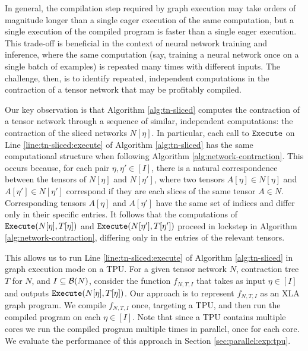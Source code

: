 In general, the compilation step required by graph execution may take orders of magnitude longer than a single eager execution of the same computation, but a single execution of the compiled program is faster than a single eager execution. 
This trade-off is beneficial in the context of neural network training and inference, where the same computation (say, training a neural network once on a single batch of examples) is repeated many times with different inputs.
The challenge, then, is to identify repeated, independent computations in the contraction of a tensor network that may be profitably compiled.

Our key observation is that Algorithm \ref{alg:tn-sliced} computes the contraction of a tensor network through a sequence of similar, independent computations: the contraction of the sliced networks $N[\eta]$. In particular, each call to $\texttt{\upshape Execute}$ on Line \ref{line:tn-sliced:execute} of Algorithm \ref{alg:tn-sliced} has the same computational structure when following Algorithm \ref{alg:network-contraction}. This occurs because, for each pair $\eta, \eta' \in [I]$, there is a natural correspondence between the tensors of $N[\eta]$ and $N[\eta']$, where two tensors $A[\eta] \in N[\eta]$ and $A[\eta'] \in N[\eta']$ correspond if they are each slices of the same tensor $A \in N$. Corresponding tensors $A[\eta]$ and $A[\eta']$ have the same set of indices and differ only in their specific entries.
It follows that the computations of $\texttt{\upshape Execute}(N[\eta], T[\eta])$ and $\texttt{\upshape Execute}(N[\eta'], T[\eta'])$ proceed in lockstep in Algorithm \ref{alg:network-contraction}, differing only in the entries of the relevant tensors.

This allows us to run Line \ref{line:tn-sliced:execute} of Algorithm \ref{alg:tn-sliced} in graph execution mode on a TPU.
For a given tensor network $N$, contraction tree $T$ for $N$, and $I \subseteq \mathcal{B}(N)$, consider the function $f_{N,T,I}$ that takes as input $\eta \in [I]$ and outputs $\texttt{\upshape Execute}(N[\eta], T[\eta])$.
Our approach is to represent $f_{N,T,I}$ as an XLA graph program.
We compile $f_{N,T,I}$ once, targeting a TPU, and then run the compiled program on each $\eta \in [I]$.
Note that since a TPU contains multiple cores we run the compiled program multiple times in parallel, once for each core.
We evaluate the performance of this approach in Section \ref{sec:parallel:exp:tpu}.

